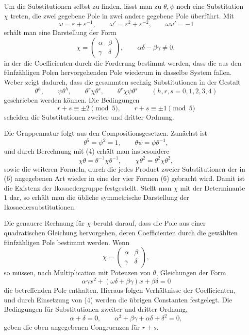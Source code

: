 \documentclass[11pt]{article}
\providecommand{\eps}{\varepsilon}
\providecommand{\eps}{\varepsilon}
\providecommand{\mat}[4]{\begin{pmatrix}#1&#2\\#3&#4\end{pmatrix}}
\providecommand{\mat}[4]{\begin{pmatrix}#1&#2\\#3&#4\end{pmatrix}}
\providecommand{\mat}[1]{\begin{pmatrix}#1\end{pmatrix}}
\begin{document}
Um die Substitutionen selbst zu finden, lässt man zu $\theta,\psi$ noch eine Substitution $\chi$ treten, die zwei gegebene Pole in zwei andere gegebene Pole überführt. Mit
\[
 \omega=\eps+\eps^{-1},\qquad \omega'=\eps^2+\eps^{-2},\qquad
 \omega\omega'=-1
\tag{4}
\]
erhält man eine Darstellung der Form
\begin{equation}
 \chi=\mat{\alpha}{\beta}{\gamma}{\delta},
\qquad
 \alpha\delta-\beta\gamma\ne0,
\tag{5}
\end{equation}
in der die Coefficienten durch die Forderung bestimmt werden, dass die aus den fünfzähligen Polen hervorgehenden Pole wiederum in dasselbe System fallen. Weber zeigt dadurch, dass die gesammten sechzig Substitutionen in der Gestalt
\begin{equation}
 \theta^h,\qquad
 \psi\theta^h,\qquad
 \theta^r\chi\theta^s,\qquad
 \theta^r\chi\psi\theta^s\qquad (h,r,s=0,1,2,3,4)
\tag{6}
\end{equation}
geschrieben werden können. Die Bedingungen
\[
 r+s\equiv \pm2\pmod5,\qquad r+s\equiv \pm1\pmod5
\]
scheiden die Substitutionen zweiter und dritter Ordnung.

Die Gruppennatur folgt aus den Compositionsgesetzen. Zunächst ist
\begin{equation}
 \theta^5=\psi^2=1,\qquad \theta\psi=\psi\theta^{-1},
\tag{7}
\end{equation}
und durch Berechnung mit (4) erhält man insbesondere
\begin{equation}
 \chi\theta=\theta^{-1}\chi\theta^{-1},\qquad
 \chi\theta^2=\theta^2\chi\theta^2,
\tag{8}
\end{equation}
sowie die weiteren Formeln, durch die jedes Product zweier Substitutionen der in (6) angegebenen Art wieder in eine der vier Formen (6) gebracht wird. Damit ist die Existenz der Ikosaedergruppe festgestellt. Stellt man $\chi$ mit der Determinante $1$ dar, so erhält man die übliche symmetrische Darstellung der Ikosaedersubstitutionen.

Die genauere Rechnung für $\chi$ beruht darauf, dass die Pole aus einer quadratischen Gleichung hervorgehen, deren Coefficienten durch die gewählten fünfzähligen Pole bestimmt werden. Wenn
\[
 \chi=\mat{\alpha}{\beta}{\gamma}{\delta},
\]
so müssen, nach Multiplication mit Potenzen von $\theta$, Gleichungen der Form
\[
 \alpha\gamma x^2+(\omega\delta+\beta\gamma)x+\beta\delta=0
\]
die betreffenden Pole enthalten. Hieraus folgen Verhältnisse der Coefficienten, und durch Einsetzung von (4) werden die übrigen Constanten festgelegt. Die Bedingungen für Substitutionen zweiter und dritter Ordnung,
\[
 \alpha+\delta=0,\qquad
 \alpha^2+\beta\gamma+\alpha\delta+\delta^2=0,
\]
geben die oben angegebenen Congruenzen für $r+s$.
\end{document}
